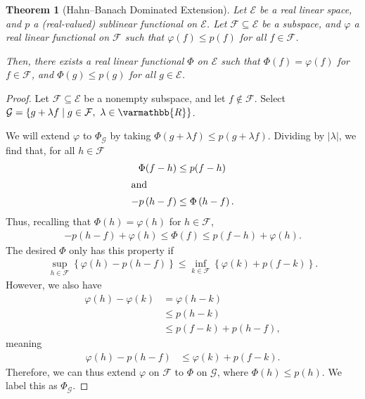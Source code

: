 \documentclass[10pt]{extarticle}
\newcommand{\R}{\mathbb{R}}
\newcommand{\set}[1]{\left\{#1\right\}}
\theoremstyle{plain}
\newtheorem*{theorem}{Theorem}
\theoremstyle{definition}
\theoremstyle{note}
\renewcommand*{\mathbb}[1]{\varmathbb{#1}}
\renewcommand{\newline}{\hfill\break}
\begin{document}
\begin{theorem}[Hahn--Banach Dominated Extension]
  Let $\mathcal{E}$ be a real linear space, and $p$ a (real-valued) sublinear functional on $\mathcal{E}$. Let $\mathcal{F}\subseteq \mathcal{E}$ be a subspace, and $\varphi$ a real linear functional on $\mathcal{F}$ such that $\varphi(f) \leq p(f)$ for all $f\in \mathcal{F}$.\newline

  Then, there exists a real linear functional $\Phi$ on $\mathcal{E}$ such that $\Phi(f) = \varphi(f)$ for $f\in \mathcal{F}$, and $\Phi(g) \leq p(g)$ for all $g\in \mathcal{E}$.
\end{theorem}
\begin{proof}
  Let $\mathcal{F}\subseteq \mathcal{E}$ be a nonempty subspace, and let $f\notin \mathcal{F}$. Select $\mathcal{G} = \set{g + \lambda f\mid g\in \mathcal{F},~\lambda \in \R}$.\newline

  We will extend $\varphi$ to $\Phi_{\mathcal{G}}$ by taking $\Phi(g + \lambda f)\leq p(g + \lambda f)$. Dividing by $|\lambda|$, we find that, for all $h\in \mathcal{F}$
  \begin{align*}
    \Phi(f - h) &\leq p(f - h)\\
    \intertext{and}
    -p\left(h - f\right)&\leq \Phi\left(h - f\right).
  \end{align*}
  Thus, recalling that $\Phi(h) = \varphi(h)$ for $h\in \mathcal{F}$,
  \begin{align*}
    -p\left(h-f\right) + \varphi(h) \leq \Phi\left(f\right) \leq p(f-h) + \varphi(h).
  \end{align*}
  The desired $\Phi$ only has this property if
  \begin{align*}
    \sup_{h\in \mathcal{F}}\set{\varphi(h) - p(h-f)} \leq \inf_{k\in \mathcal{F}}\set{\varphi(k) + p(f-k)}.
  \end{align*}
  However, we also have
  \begin{align*}
    \varphi(h)- \varphi(k) &= \varphi(h-k)\\
                           &\leq p(h-k)\\
                           &\leq p(f-k) + p(h-f),
  \end{align*}
  meaning
  \begin{align*}
    \varphi(h) - p(h-f) &\leq \varphi(k) + p(f-k).
  \end{align*}
  Therefore, we can thus extend $\varphi$ on $\mathcal{F}$ to $\Phi$ on $\mathcal{G}$, where $\Phi(h) \leq p(h)$. We label this as $\Phi_{\mathcal{G}}$.\newline


\end{proof}
\end{document}
